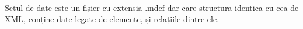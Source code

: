 \newpage
\section{}

Setul de date este un fișier cu extensia .mdef dar care structura identica cu cea de XML, 
conține date legate de elemente, și relațiile dintre ele.